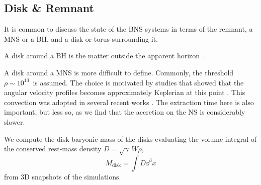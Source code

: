 \subsection{Disk \& Remnant}\label{sec:bns_sims:method:disk}

It is common to discuss the \pmerg{} state of the \ac{BNS} systems in terms of the remnant, 
a \ac{MNS} or a \ac{BH}, and a disk or torus surrounding it. 

A disk around a \ac{BH} is the matter outside the apparent horizon 
\citep[\eg]{Dietrich:2015iva,Dietrich:2016hky}. 

A disk around a \ac{MNS} is more difficult to define. Commonly, the 
threshold $\rho\sim 10^{13}$~\gcm is assumed. The choice is motivated by studies that 
showed that the angular velocity profiles becomes approximately Keplerian at this point 
\citep[\eg][]{Shibata:2005ss,Shibata:2006nm,Hanauske:2016gia,Kastaun:2016elu}.
This convection was adopted in several recent works 
\citep{Radice:2018pdn,Kiuchi:2019lls,Vincent:2019kor}.
The extraction time here is also important, but less so, as we find that the accretion on the 
\ac{NS} is considerably slower.
%


We compute the disk baryonic mass of the disks evaluating
the volume integral of the conserved rest-mass density $D=\sqrt{\gamma}~W\rho$,
%
\begin{equation}
\label{eq:method:mdisk}
M_{\text{disk}} = \int D \dd^3 x
\end{equation}
%
from $3$D snapshots of the simulations.%

